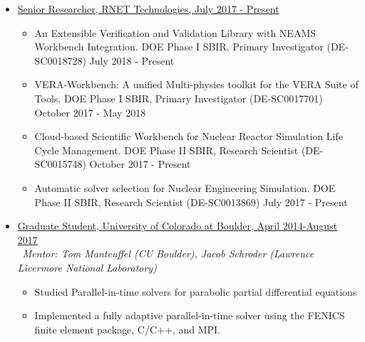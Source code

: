 \begin{itemize}
\setlength{\itemsep}{0.2pt}
  
\item\underline{Senior Researcher, RNET Technologies, July 2017 - Present}
  \begin{itemize}
	  \item An Extensible Verification and Validation Library with NEAMS Workbench Integration. DOE Phase I SBIR, Primary Investigator (DE-SC0018728) July 2018 - Present
 \item VERA-Workbench: A unified Multi-physics toolkit for the VERA Suite of Tools.
DOE Phase I SBIR, Primary Investigator (DE-SC0017701) October 2017 - May 2018
\item Cloud-based Scientific Workbench for Nuclear Reactor Simulation Life Cycle Management.
DOE Phase II SBIR, Research Scientist (DE-SC0015748) October 2017 - Present
\item Automatic solver selection for Nuclear Engineering Simulation.
DOE Phase II SBIR, Research Scientist (DE-SC0013869) July 2017 - Present
\end{itemize}
\item\underline{Graduate Student, University of Colorado at Boulder, April 2014-August 2017}\\\
{\em Mentor: Tom Manteuffel (CU Boulder), Jacob Schroder (Lawrence Livermore National Laboratory)}
\begin{itemize}
\item Studied Parallel-in-time solvers for parabolic partial differential equations
\item Implemented a fully adaptive parallel-in-time solver using the FENICS finite element package, C/C++, and MPI.

\end{itemize}
\end{itemize}
